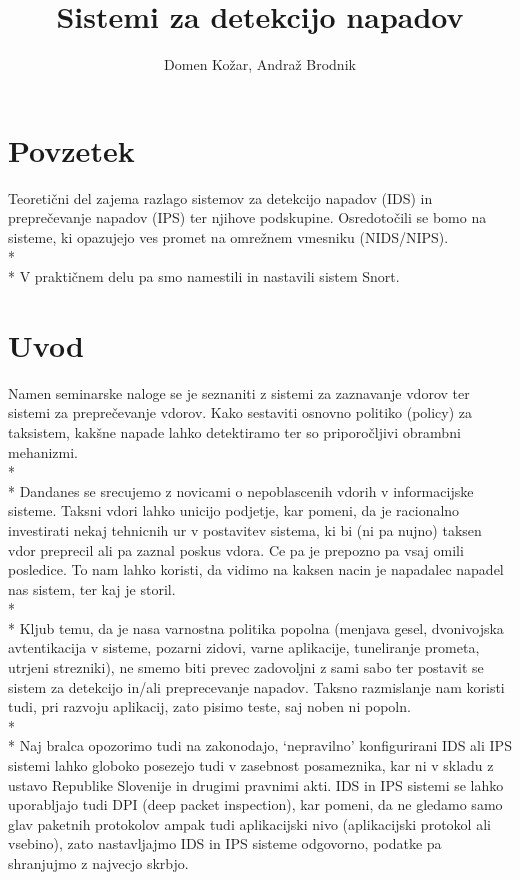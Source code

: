 \documentclass[12pt]{article}
\title{Sistemi za detekcijo napadov}
\author{Domen Kožar, Andraž Brodnik}
\let\stdsection\section
\renewcommand\section{\newpage\stdsection}
\begin{document}
\maketitle

\tableofcontents

\section{Povzetek}
Teoretični del zajema razlago sistemov za detekcijo napadov (IDS) in preprečevanje napadov (IPS) 
ter njihove podskupine. 
Osredotočili se bomo na sisteme, ki opazujejo ves promet na omrežnem vmesniku (NIDS/NIPS).
\\*
\\*
V praktičnem delu pa smo namestili in nastavili sistem Snort.

\section{Uvod}

Namen seminarske naloge se je seznaniti z sistemi za zaznavanje vdorov ter sistemi za preprečevanje vdorov. 
Kako sestaviti osnovno politiko (policy) za taksistem, kakšne napade lahko detektiramo ter so priporočljivi obrambni mehanizmi.
\\*
\\*
Dandanes se srecujemo z novicami o nepoblascenih vdorih v informacijske sisteme. Taksni vdori lahko unicijo podjetje, kar pomeni, da je racionalno investirati nekaj tehnicnih ur v postavitev sistema, ki bi (ni pa nujno) taksen vdor preprecil ali pa zaznal poskus vdora.
Ce pa je prepozno pa vsaj omili posledice. To nam lahko koristi,
da vidimo na kaksen nacin je napadalec napadel nas sistem, ter kaj je storil. 
\\*
\\*
Kljub temu, da je nasa varnostna politika popolna (menjava gesel, dvonivojska avtentikacija v sisteme, pozarni zidovi, varne aplikacije, tuneliranje prometa, utrjeni strezniki), ne smemo biti prevec zadovoljni z sami sabo ter postavit se sistem za detekcijo in/ali preprecevanje napadov.
Taksno razmislanje nam koristi tudi, pri razvoju aplikacij, zato pisimo teste, saj noben ni popoln.
\\*
\\*
Naj bralca opozorimo tudi na zakonodajo, `nepravilno' konfigurirani IDS ali IPS sistemi lahko globoko posezejo
tudi v zasebnost posameznika, kar ni v skladu z ustavo Republike Slovenije in drugimi pravnimi akti.
IDS in IPS sistemi se lahko uporabljajo tudi DPI (deep packet inspection), kar pomeni, da ne gledamo samo glav paketnih protokolov ampak tudi aplikacijski nivo (aplikacijski protokol ali vsebino), 
zato nastavljajmo IDS in IPS sisteme odgovorno, podatke pa shranjujmo z najvecjo skrbjo.
\end{document}
